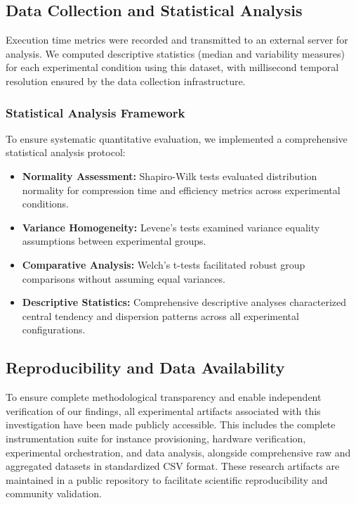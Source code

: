 \documentclass[conference]{IEEEtran}
\begin{document}
	\subsection{Data Collection and Statistical Analysis}
	\label{data-collection-and-storage}
	
	Execution time metrics were recorded and transmitted to an external server for analysis. We computed descriptive statistics (median and variability measures) for each experimental condition using this dataset, with millisecond temporal resolution ensured by the data collection infrastructure.
	
	\subsubsection{Statistical Analysis Framework}
	To ensure systematic quantitative evaluation, we implemented a comprehensive statistical analysis protocol:
	
	\begin{itemize}
		\item \textbf{Normality Assessment:} Shapiro-Wilk tests evaluated distribution normality for compression time and efficiency metrics across experimental conditions.
		\item \textbf{Variance Homogeneity:} Levene's tests examined variance equality assumptions between experimental groups.
		\item \textbf{Comparative Analysis:} Welch's t-tests facilitated robust group comparisons without assuming equal variances.
		\item \textbf{Descriptive Statistics:} Comprehensive descriptive analyses characterized central tendency and dispersion patterns across all experimental configurations.
	\end{itemize}
	
	\subsection{Reproducibility and Data Availability}
	
	To ensure complete methodological transparency and enable independent verification of our findings, all experimental artifacts associated with this investigation have been made publicly accessible. This includes the complete instrumentation suite for instance provisioning, hardware verification, experimental orchestration, and data analysis, alongside comprehensive raw and aggregated datasets in standardized CSV format. These research artifacts are maintained in a public repository to facilitate scientific reproducibility and community validation.
	
\end{document}
